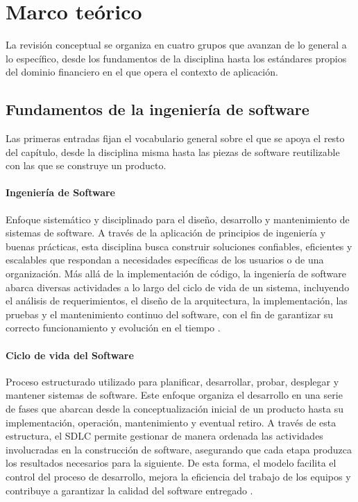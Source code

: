 
\label{cap:marco}

\section{Marco teórico}
La revisión conceptual se organiza en cuatro grupos que avanzan de lo
general a lo específico, desde los fundamentos de la disciplina hasta los
estándares propios del dominio financiero en el que opera el contexto de
aplicación.

\subsection{Fundamentos de la ingeniería de software}

Las primeras entradas fijan el vocabulario general sobre el que se apoya
el resto del capítulo, desde la disciplina misma hasta las piezas de
software reutilizable con las que se construye un producto.
\paragraph*{Ingeniería de Software}
Enfoque sistemático y disciplinado para el diseño, desarrollo y mantenimiento de sistemas de software. A través de la aplicación de principios de ingeniería y buenas prácticas, esta disciplina busca construir soluciones confiables, eficientes y escalables que respondan a necesidades específicas de los usuarios o de una organización. Más allá de la implementación de código, la ingeniería de software abarca diversas actividades a lo largo del ciclo de vida de un sistema, incluyendo el análisis de requerimientos, el diseño de la arquitectura, la implementación, las pruebas y el mantenimiento continuo del software, con el fin de garantizar su correcto funcionamiento y evolución en el tiempo \citep{Jazayeri2003}.
\paragraph*{Ciclo de vida del Software}
Proceso estructurado utilizado para planificar, desarrollar, probar, desplegar y mantener sistemas de software. Este enfoque organiza el desarrollo en una serie de fases que abarcan desde la conceptualización inicial de un producto hasta su implementación, operación, mantenimiento y eventual retiro. A través de esta estructura, el SDLC permite gestionar de manera ordenada las actividades involucradas en la construcción de software, asegurando que cada etapa produzca los resultados necesarios para la siguiente. De esta forma, el modelo facilita el control del proceso de desarrollo, mejora la eficiencia del trabajo de los equipos y contribuye a garantizar la calidad del software entregado \citep{Jazayeri2003}.
